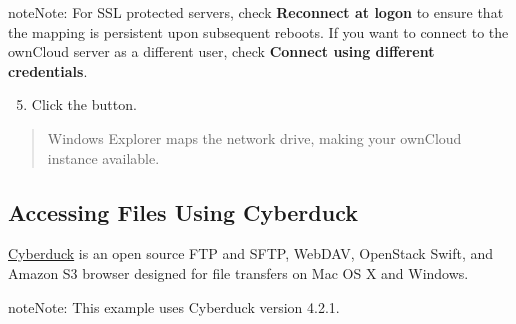 \documentclass[letterpaper,10pt,english]{sphinxmanual}
\begin{document}
\begin{notice}{note}{Note:}
For SSL protected servers, check \textbf{Reconnect at logon} to ensure
that the mapping is persistent upon subsequent reboots. If you want to
connect to the ownCloud server as a different user, check \textbf{Connect using
different credentials}.
\end{notice}
\begin{figure}[htbp]
\centering

\end{figure}
\begin{enumerate}
\setcounter{enumi}{4}
\item {} 
Click the  button.

\end{enumerate}
\begin{quote}

Windows Explorer maps the network drive, making your ownCloud instance
available.
\end{quote}


\subsection{Accessing Files Using Cyberduck}
\label{files/access_webdav:accessing-files-using-cyberduck}
\href{https://cyberduck.io/?l=en}{Cyberduck} is an open source FTP and SFTP,
WebDAV, OpenStack Swift, and Amazon S3 browser designed for file transfers on
Mac OS X and Windows.

\begin{notice}{note}{Note:}
This example uses Cyberduck version 4.2.1.
\end{notice}
\end{document}

